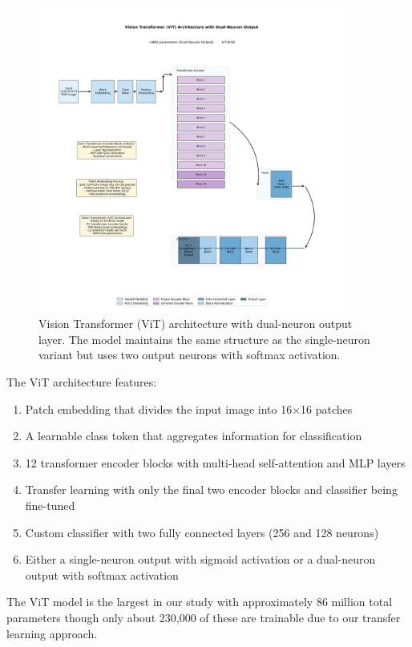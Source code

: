 \begin{figure}[!htbp]
\centering
\includegraphics[width=0.9\textwidth]{figures/vit_2neuron_architecture.png}
\caption{Vision Transformer (ViT) architecture with dual-neuron output layer. The model maintains the same structure as the single-neuron variant but uses two output neurons with softmax activation.}
\label{fig:vit_arch_dual}
\end{figure}

The ViT architecture features:
\begin{enumerate}
\item Patch embedding that divides the input image into 16×16 patches
\item A learnable class token that aggregates information for classification
\item 12 transformer encoder blocks with multi-head self-attention and MLP layers
\item Transfer learning with only the final two encoder blocks and classifier being fine-tuned
\item Custom classifier with two fully connected layers (256 and 128 neurons)
\item Either a single-neuron output with sigmoid activation or a dual-neuron output with softmax activation
\end{enumerate}

The ViT model is the largest in our study with approximately 86 million total parameters though only about 230,000 of these are trainable due to our transfer learning approach.

